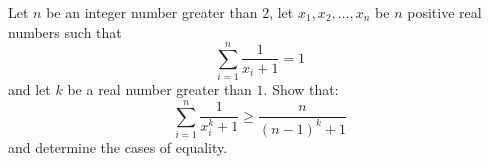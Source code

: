 Let $n$ be an integer number greater than $2$, let $x_{1},x_{2},\ldots ,x_{n}$ be $n$ positive real numbers such that
\[\sum_{i=1}^{n}\frac{1}{x_{i}+1}=1\]
and let $k$ be a real number greater than $1$. Show that:
\[\sum_{i=1}^{n}\frac{1}{x_{i}^{k}+1}\ge\frac{n}{(n-1)^{k}+1}\]
and  determine the cases of equality.